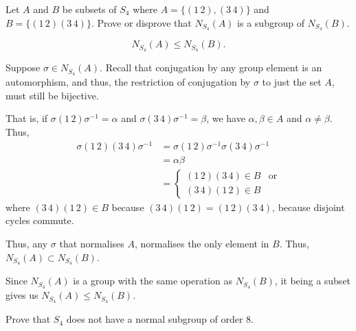 \documentclass[12 pt, letterpaper]{hmcpset}
\begin{document}
\begin{problem}[1.]
	Let $A$ and $B$ be subsets of $S_{4}$ where $A = \{ (1 \, 2), (3 \, 4) \}$ and $B = \{ (1 \, 2)(3 \, 4) \}$. Prove or disprove that $N_{S_{4}}(A)$ is a subgroup of $N_{S_{4}}(B)$.
\end{problem}

\begin{solution}
	\[
		\boxed{
			N_{S_{4}}(A) \le N_{S_{4}}(B).
		}
	\] 

	Suppose $\sigma \in N_{S_{4}}(A)$. Recall that conjugation by any group element is an automorphism, and thus, the restriction of conjugation by $\sigma$ to just the set $A$, must still be bijective. 

	That is, if $\sigma (1 \, 2) \sigma^{-1} = \alpha$ and $\sigma (3 \, 4) \sigma^{-1} = \beta$, we have $\alpha, \beta \in A$ and $\alpha \neq \beta$. Thus,
	\[
		\begin{split}
			\sigma (1 \, 2) (3 \, 4) \sigma^{-1} & = \sigma (1 \, 2) \sigma^{-1} \sigma (3 \, 4) \sigma^{-1} \\
							     & = \alpha \beta \\
							     & = \begin{cases}
								     (1 \, 2) (3 \, 4) \in B & \text{or} \\
								     (3 \, 4) (1 \, 2) \in B
							     \end{cases}
		\end{split}
	\]
	where $(3 \, 4)(1 \, 2) \in B$ because $(3 \, 4)(1 \, 2) = (1 \, 2)(3 \, 4)$, because disjoint cycles commute. 

	Thus, any $\sigma$ that normalises $A$, normalises the only element in $B$. Thus, $N_{S_{4}}(A) \subset N_{S_{4}}(B)$. 

	Since $N_{S_{4}}(A)$ is a group with the same operation as $N_{S_{4}}(B)$, it being a subset gives us $N_{S_{4}}(A) \le N_{S_{4}}(B)$.
\end{solution}

\pagebreak

\begin{problem}[2.]
	Prove that $S_{4}$ does not have a normal subgroup of order $8$.
\end{problem}
\end{document}
